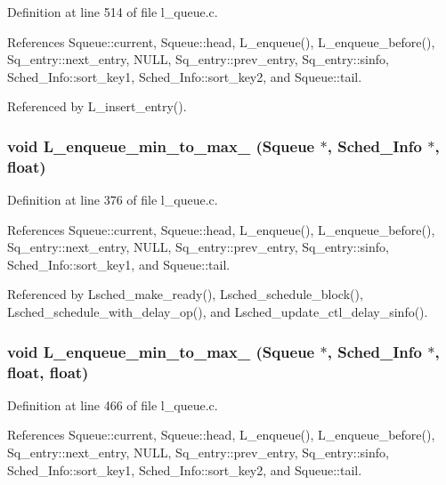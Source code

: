 Definition at line 514 of file l\_\-queue.c.

References Squeue::current, Squeue::head, L\_\-enqueue(), L\_\-enqueue\_\-before(), Sq\_\-entry::next\_\-entry, NULL, Sq\_\-entry::prev\_\-entry, Sq\_\-entry::sinfo, Sched\_\-Info::sort\_\-key1, Sched\_\-Info::sort\_\-key2, and Squeue::tail.

Referenced by L\_\-insert\_\-entry().
\subsubsection{\setlength{\rightskip}{0pt plus 5cm}void L\_\-enqueue\_\-min\_\-to\_\-max\_ (\bf{Squeue} $\ast$, \bf{Sched\_\-Info} $\ast$, float)}\label{l__schedule_8h_e278f5234f84c9b05911d79d4f35889f}




Definition at line 376 of file l\_\-queue.c.

References Squeue::current, Squeue::head, L\_\-enqueue(), L\_\-enqueue\_\-before(), Sq\_\-entry::next\_\-entry, NULL, Sq\_\-entry::prev\_\-entry, Sq\_\-entry::sinfo, Sched\_\-Info::sort\_\-key1, and Squeue::tail.

Referenced by Lsched\_\-make\_\-ready(), Lsched\_\-schedule\_\-block(), Lsched\_\-schedule\_\-with\_\-delay\_\-op(), and Lsched\_\-update\_\-ctl\_\-delay\_\-sinfo().
\subsubsection{\setlength{\rightskip}{0pt plus 5cm}void L\_\-enqueue\_\-min\_\-to\_\-max\_ (\bf{Squeue} $\ast$, \bf{Sched\_\-Info} $\ast$, float, float)}\label{l__schedule_8h_54d2f953a9ec7bb9960f1a6dc2bfb26a}




Definition at line 466 of file l\_\-queue.c.

References Squeue::current, Squeue::head, L\_\-enqueue(), L\_\-enqueue\_\-before(), Sq\_\-entry::next\_\-entry, NULL, Sq\_\-entry::prev\_\-entry, Sq\_\-entry::sinfo, Sched\_\-Info::sort\_\-key1, Sched\_\-Info::sort\_\-key2, and Squeue::tail.
